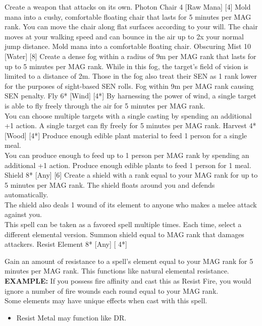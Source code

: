 \begin{pathele}
{Create a weapon that attacks on its own.}
\spelldescription
{Photon Chair}
{4}
[Raw Mana]
[4]
{Mold mana into a cushy, comfortable floating chair that lasts for 5 minutes per MAG rank. You can move the chair along flat surfaces according to your will. The chair moves at your walking speed and can bounce in the air up to 2x your normal jump distance.}
{Mold mana into a comfortable floating chair.}
\spelldescription
{Obscuring Mist}
{10}
[Water]
[8]
{Create a dense fog within a radius of 9m per MAG rank that lasts for up to 5 minutes per MAG rank. While in this fog, the target's field of vision is limited to a distance of 2m. Those in the fog also treat their SEN as 1 rank lower for the purposes of sight-based SEN rolls.}
{Fog within 9m per MAG rank causing SEN penalty.}
\spelldescription
{Fly}
{6*}
[Wind]
[4*]
{By harnessing the power of wind, a single target is able to fly freely through the air for 5 minutes per MAG rank.\\
You can choose multiple targets with a single casting by spending an additional +1 action.}
{A single target can fly freely for 5 minutes per MAG rank.}
\spelldescription
{Harvest}
{4*}
[Wood]
[4*]
{Produce enough edible plant material to feed 1 person for a single meal.\\You can produce enough to feed up to 1 person per MAG rank by spending an additional +1 action.}
{Produce enough edible plants to feed 1 person for 1 meal.}
\spelldescription
{Shield}
{8*}
[Any]
[6]
{Create a shield with a rank equal to your MAG rank for up to 5 minutes per MAG rank. The shield floats around you and defends automatically.\\The shield also deals 1 wound of its element to anyone who makes a melee attack against you.\\This spell can be taken as a favored spell multiple times. Each time, select a different elemental version.}
{Summon shield equal to MAG rank that damages attackers.}
\spelldescription
{Resist Element}
{8*}
[Any]
[ 4*]
{Gain an amount of resistance to a spell's element equal to your MAG rank for 5 minutes per MAG rank. This functions like natural elemental resistance.\\\textbf{EXAMPLE:} If you possess fire affinity and cast this as Resist Fire, you would ignore a number of fire wounds each round equal to your MAG rank.\\Some elements may have unique effects when cast with this spell.
\begin{itemize}
\item Resist Metal may function like DR.

\end{itemize}}
\end{pathele}
